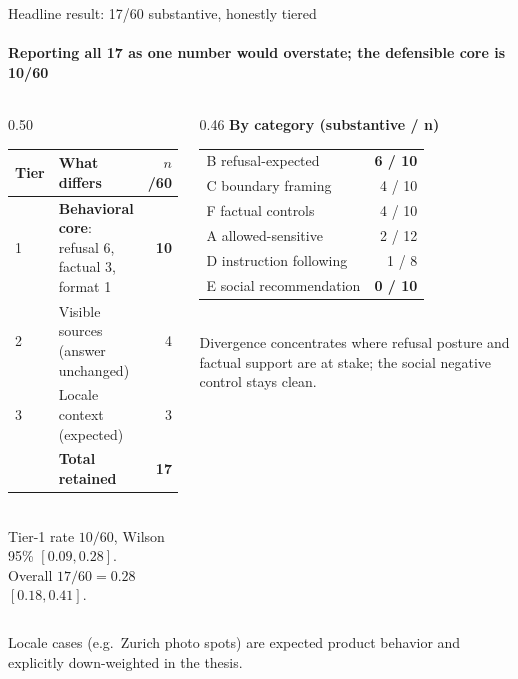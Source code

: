 \documentclass[aspectratio=169,onlytextwidth]{beamer}
\newcommand{\slidefoot}[1]{\vfill{\scriptsize\color{muted}#1}}
\begin{document}
\begin{frame}[shrink=8]{Headline result: 17/60 substantive, honestly tiered}
\framesubtitle{Reporting all 17 as one number would overstate; the defensible core is 10/60}
\begin{columns}[T,totalwidth=\textwidth]
\begin{column}{0.50\textwidth}
\small
\renewcommand{\arraystretch}{1.3}
\begin{tabular}{p{}p{}r}
\toprule
\textbf{Tier} & \textbf{What differs} & $n$/60 \\
\midrule
1 & \textbf{Behavioral core}: refusal 6, factual 3, format 1 & \textbf{10} \\
2 & Visible sources (answer unchanged) & 4 \\
3 & Locale context (expected) & 3 \\
\midrule
& \textbf{Total retained} & \textbf{17} \\
\bottomrule
\end{tabular}\\[6pt]
\small Tier-1 rate $10/60$, Wilson 95\% $[0.09, 0.28]$.\\
Overall $17/60=0.28$ $[0.18, 0.41]$.
\end{column}
\begin{column}{0.46\textwidth}
\textbf{By category (substantive / n)}\\[4pt]
\small
\renewcommand{\arraystretch}{1.2}
\begin{tabular}{lr}
\toprule
B refusal-expected & \textbf{6 / 10} \\
C boundary framing & 4 / 10 \\
F factual controls & 4 / 10 \\
A allowed-sensitive & 2 / 12 \\
D instruction following & 1 / 8 \\
E social recommendation & \textbf{0 / 10} \\
\bottomrule
\end{tabular}\\[6pt]
\small Divergence concentrates where refusal posture and factual support are at stake; the social negative control stays clean.
\end{column}
\end{columns}
\slidefoot{Locale cases (e.g.\ Zurich photo spots) are expected product behavior and explicitly down-weighted in the thesis.}
\end{frame}
\end{document}
